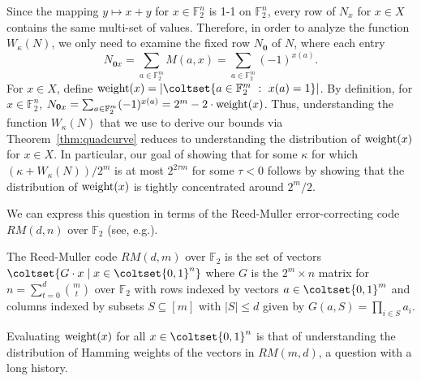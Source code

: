 Since the mapping $y\mapsto x+y$ for $x\in \mathbb{F}_2^n$ is
1-1 on $\mathbb{F}_2^n$, 
every row of $N_x$ for $x\in X$ contains the same multi-set of values.
Therefore, in order to analyze the function $W_\kappa(N)$,
we only need to examine the fixed row $N_\mathbf{0}$ of $N$,
where each entry
$$N_{\mathbf{0}x}=\sum_{a\in \mathbb{F}_2^m} M(a,x)=\sum_{a\in \mathbb{F}_2^m}(-1)^{x(a)}.$$
For $x\in X$, define $\w(x)=|\coltset{a\in \mathbb{F}_2^m\ :\ x(a)=1}|$.
By definition, for $x\in \mathbb{F}_2^n$, 
$N_{\mathbf{0}x}=\sum_{a\in \mathbb{F}_2^m}(-1)^{x(a)}=2^m-2\cdot \textrm{weight}(x)$.
Thus, understanding the function $W_\kappa(N)$ that we use to derive our
bounds via Theorem~\ref{thm:quadcurve} reduces to understanding the distribution of
$\textrm{weight}(x)$ for $x\in X$.
In particular, our goal of showing that for some $\kappa$ for which
$(\kappa+W_\kappa(N))/2^m$ is at most $2^{2\tau m}$ for some $\tau<0$ 
follows by showing that the distribution of $\textrm{weight}(x)$ is tightly concentrated
around $2^{m}/2$.

We can express this question in terms of 
the Reed-Muller error-correcting code $RM(d,n)$ over $\mathbb{F}_2$
(see, e.g.\cite{berlekamp-book}).

\begin{defn}
The Reed-Muller code $RM(d,m)$ over $\mathbb{F}_2$ is the set of vectors
$\coltset{G\cdot x\mid x\in \coltset{0,1}^n}$ where $G$ is the $2^m\times n$ matrix
for $n=\sum_{t=0}^d \binom{m}{t}$ over $\mathbb{F}_2$
with rows indexed by vectors $a\in \coltset{0,1}^m$ and columns indexed by
subsets $S\subseteq [m]$ with $|S|\le d$ given by $G(a,S)=\prod_{i\in S} a_i$.
\end{defn}


Evaluating $\textrm{weight}(x)$ for all $x\in \coltset{0,1}^n$ is that of
understanding the distribution of Hamming weights of the vectors in $RM(m,d)$,
a question with a long history.


